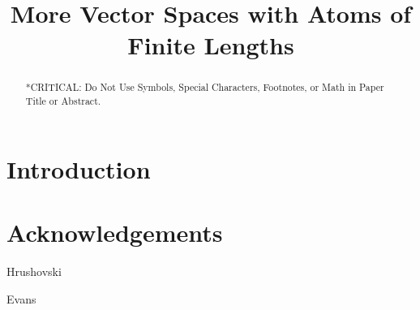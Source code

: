 \documentclass[conference]{IEEEtran}
\theoremstyle{definition}
\theoremstyle{remark}
\begin{document}
\title{More Vector Spaces with Atoms of Finite Lengths
}

\author{

\and

\and
}

\maketitle

\begin{abstract}
*CRITICAL: Do Not Use Symbols, Special Characters, Footnotes, or Math in Paper Title or Abstract.
\end{abstract}


\section{Introduction}




\section*{Acknowledgements}
Hrushovski

Evans

\printbibliography
\end{document}

